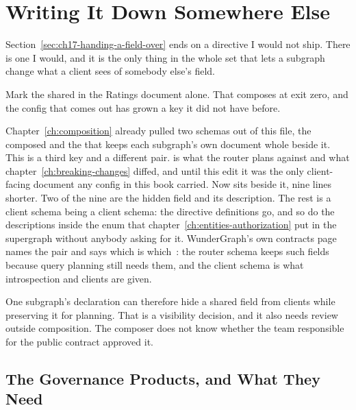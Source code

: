 \section{Writing It Down Somewhere Else}
\label{sec:ch17-writing-it-down-somewhere-else}

%
Section~\ref{sec:ch17-handing-a-field-over} ends on a directive I would not
ship. There is one I would, and it is the only thing in the whole set that
lets a subgraph change what a client sees of somebody else's field.

%
Mark the shared   in the Ratings document
alone. That composes at exit zero, and the config that comes out has grown a
key it did not have before.

%
Chapter~\ref{ch:composition} already pulled two schemas out of this file, the
composed  and the  that keeps each
subgraph's own document whole beside it. This is a third key and a different
pair.  is what the router plans against and what
chapter~\ref{ch:breaking-changes} diffed, and until this edit it was the only
client-facing document any config in this book carried. Now
 sits beside it, nine lines shorter. Two of the nine
are the hidden field and its description. The rest is a client schema being a
client schema: the directive definitions go, and so do the descriptions inside
the  enum that chapter~\ref{ch:entities-authorization} put
in the supergraph without anybody asking for it. WunderGraph's own contracts
page names the pair and says which is which~\autocite{cosmocontracts}: the
router schema keeps such fields because query planning still needs them, and
the client schema is what introspection and clients are given.

%
One subgraph's declaration can therefore hide a shared field from clients
while preserving it for planning. That is a visibility decision, and it also
needs review outside composition. The composer does not know whether the
team responsible for the public contract approved it.

\subsection{The Governance Products, and What They Need}

